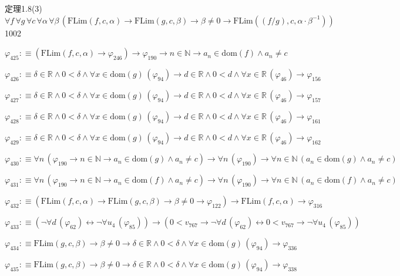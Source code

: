 \begin{fullproof}{定理1.8(3)}{$\forall f\,\forall g\,\forall c\,\forall \alpha\,\forall \beta\,(\mathrm{FLim}(f,c,\alpha) \to \mathrm{FLim}(g,c,\beta) \to \beta \neq 0 \to \mathrm{FLim}((f / g),c,\alpha \cdot \beta^{-1}))$}{1002}
\begin{abbrevlist}
\item $\varphi_{425} :\equiv (\mathrm{FLim}(f,c,\alpha) \to \varphi_{246}) \to \varphi_{190} \to n \in \mathbb{N} \to a_{n} \in \mathrm{dom}(f) \land a_{n} \neq c$
\item $\varphi_{426} :\equiv \delta \in \mathbb{R} \land 0 < \delta \land \forall x \in \mathrm{dom}(g)\,(\varphi_{94}) \to d \in \mathbb{R} \land 0 < d \land \forall x \in \mathbb{R}\,(\varphi_{46}) \to \varphi_{156}$
\item $\varphi_{427} :\equiv \delta \in \mathbb{R} \land 0 < \delta \land \forall x \in \mathrm{dom}(g)\,(\varphi_{94}) \to d \in \mathbb{R} \land 0 < d \land \forall x \in \mathbb{R}\,(\varphi_{46}) \to \varphi_{157}$
\item $\varphi_{428} :\equiv \delta \in \mathbb{R} \land 0 < \delta \land \forall x \in \mathrm{dom}(g)\,(\varphi_{94}) \to d \in \mathbb{R} \land 0 < d \land \forall x \in \mathbb{R}\,(\varphi_{46}) \to \varphi_{161}$
\item $\varphi_{429} :\equiv \delta \in \mathbb{R} \land 0 < \delta \land \forall x \in \mathrm{dom}(g)\,(\varphi_{94}) \to d \in \mathbb{R} \land 0 < d \land \forall x \in \mathbb{R}\,(\varphi_{46}) \to \varphi_{162}$
\item $\varphi_{430} :\equiv \forall n\,(\varphi_{190} \to n \in \mathbb{N} \to a_{n} \in \mathrm{dom}(g) \land a_{n} \neq c) \to \forall n\,(\varphi_{190}) \to \forall n \in \mathbb{N}\,(a_{n} \in \mathrm{dom}(g) \land a_{n} \neq c)$
\item $\varphi_{431} :\equiv \forall n\,(\varphi_{190} \to n \in \mathbb{N} \to a_{n} \in \mathrm{dom}(f) \land a_{n} \neq c) \to \forall n\,(\varphi_{190}) \to \forall n \in \mathbb{N}\,(a_{n} \in \mathrm{dom}(f) \land a_{n} \neq c)$
\item $\varphi_{432} :\equiv (\mathrm{FLim}(f,c,\alpha) \to \mathrm{FLim}(g,c,\beta) \to \beta \neq 0 \to \varphi_{122}) \to \mathrm{FLim}(f,c,\alpha) \to \varphi_{316}$
\item $\varphi_{433} :\equiv (\neg \forall d\,(\varphi_{62}) \leftrightarrow \neg \forall u_{4}\,(\varphi_{85})) \to (0 < v_{767} \to \neg \forall d\,(\varphi_{62}) \leftrightarrow 0 < v_{767} \to \neg \forall u_{4}\,(\varphi_{85}))$
\item $\varphi_{434} :\equiv \mathrm{FLim}(g,c,\beta) \to \beta \neq 0 \to \delta \in \mathbb{R} \land 0 < \delta \land \forall x \in \mathrm{dom}(g)\,(\varphi_{94}) \to \varphi_{336}$
\item $\varphi_{435} :\equiv \mathrm{FLim}(g,c,\beta) \to \beta \neq 0 \to \delta \in \mathbb{R} \land 0 < \delta \land \forall x \in \mathrm{dom}(g)\,(\varphi_{94}) \to \varphi_{338}$

\end{abbrevlist}
\end{fullproof}
